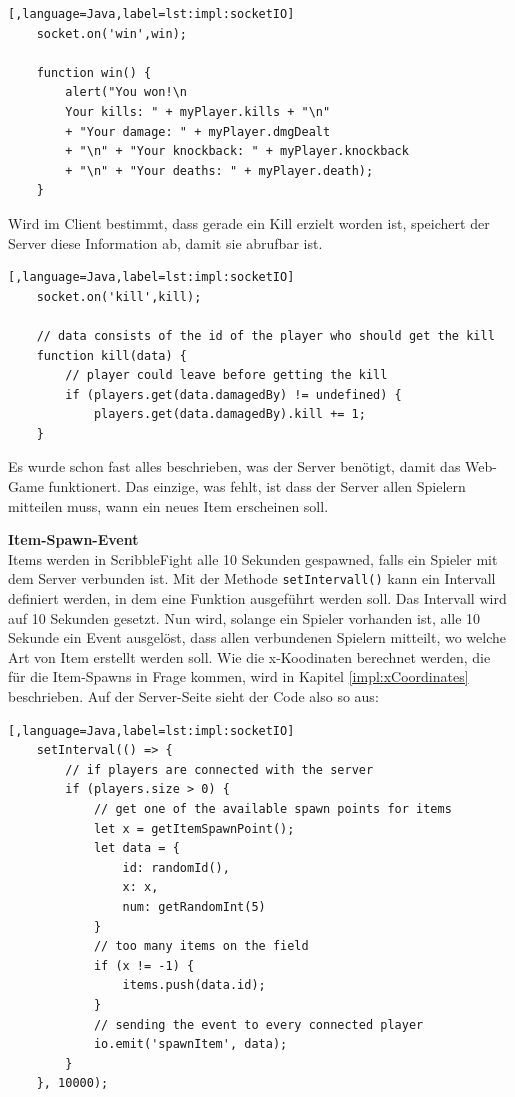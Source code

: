\begin{lstlisting}[,language=Java,label=lst:impl:socketIO]
    socket.on('win',win);
     
    function win() {
        alert("You won!\n
        Your kills: " + myPlayer.kills + "\n" 
        + "Your damage: " + myPlayer.dmgDealt 
        + "\n" + "Your knockback: " + myPlayer.knockback 
        + "\n" + "Your deaths: " + myPlayer.death);
    }
 \end{lstlisting}

Wird im Client bestimmt, dass gerade ein Kill erzielt worden ist, speichert der Server diese Information ab, damit sie abrufbar ist.
\begin{lstlisting}[,language=Java,label=lst:impl:socketIO]
    socket.on('kill',kill);
    
    // data consists of the id of the player who should get the kill
    function kill(data) {
        // player could leave before getting the kill
        if (players.get(data.damagedBy) != undefined) {
            players.get(data.damagedBy).kill += 1;
    }

 \end{lstlisting}

Es wurde schon fast alles beschrieben, was der Server benötigt, damit das Web-Game funktionert.
Das einzige, was fehlt, ist dass der Server allen Spielern mitteilen muss, wann ein neues Item erscheinen soll.

\textbf{Item-Spawn-Event} \label{impl:itemSpawnB} \\
Items werden in ScribbleFight alle 10 Sekunden gespawned, falls ein Spieler mit dem Server verbunden ist.
Mit der Methode \texttt{setIntervall()} kann ein Intervall definiert werden, in dem eine Funktion ausgeführt werden soll.
Das Intervall wird auf 10 Sekunden gesetzt. Nun wird, solange ein Spieler vorhanden ist, alle 10 Sekunde ein Event ausgelöst, dass allen verbundenen Spielern mitteilt, wo welche Art von Item erstellt werden soll.
Wie die x-Koodinaten berechnet werden, die für die Item-Spawns in Frage kommen, wird in Kapitel \ref{impl:xCoordinates} beschrieben.
Auf der Server-Seite sieht der Code also so aus:
\begin{lstlisting}[,language=Java,label=lst:impl:socketIO]
    setInterval(() => {
        // if players are connected with the server
        if (players.size > 0) {
            // get one of the available spawn points for items
            let x = getItemSpawnPoint();
            let data = {
                id: randomId(),
                x: x,
                num: getRandomInt(5)
            }
            // too many items on the field
            if (x != -1) {
                items.push(data.id);
            }
            // sending the event to every connected player
            io.emit('spawnItem', data);
        }
    }, 10000);

 \end{lstlisting}

